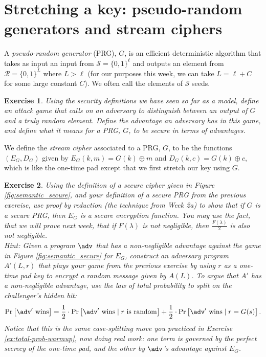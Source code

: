 \documentclass[12pt]{article}
\newcommand{\pr}[1]{\text{Pr}\left[#1\right]}
\newtheorem{exercise}{Exercise}
\theoremstyle{definition}
\theoremstyle{remark}
\theoremstyle{definition}
\begin{document}
\section*{Stretching a key: pseudo-random generators and stream ciphers}

A \emph{pseudo-random generator} (PRG), $G$, is an efficient deterministic algorithm that takes as input an input from $\mathcal{S} = \{0,1\}^\ell$ and outputs an element from $\mathcal{R} = \{0,1\}^L$ where $L > \ell$ (for our purposes this week, we can take $L = \ell + C$ for some large constant $C$). We often call the elements of $\mathcal{S}$ seeds.

\begin{exercise}\label{ex:DefinePRG} Using the security definitions we have seen so far as a model, define an attack game that calls on an adversary to distinguish between an output of $G$ and a truly random element. Define the advantage an adversary has in this game, and define what it means for a PRG, $G$, to be secure in terms of advantages.\\
\end{exercise}

We define the \emph{stream cipher} associated to a PRG, $G$, to be the functions $(E_G, D_G)$ given by $E_G(k, m) = G(k)\oplus m$ and $D_G(k, c) = G(k)\oplus c$, which is like the one-time pad except that we first stretch our key using $G$.

\begin{exercise}\label{ex:SecureStreamCipher}
Using the definition of a secure cipher given in Figure \ref{fig:semantic_secure}, and your definition of a secure PRG from the previous exercise, use proof by reduction (the technique from Week 2a) to show that if $G$ is a secure PRG, then $E_G$ is a secure encryption function. You may use the fact, that we will prove next week, that if $F(\lambda)$ is not negligible, then $\frac{F(\lambda)}{2}$ is also not negligible.\\
Hint: Given a program $\adv$ that has a non-negligible advantage against the game in Figure \ref{fig:semantic_secure} for $E_G$, construct an adversary program $A'(L, r)$ that plays your game from the previous exercise by using $r$ as a one-time pad key to encrypt a random message given by $A(L)$. To argue that $A'$ has a non-negligible advantage, use the law of total probability to split on the challenger's hidden bit: $$\pr{\adv'\text{ wins}} = \frac{1}{2}\cdot \pr{\adv'\text{ wins}\mid r\text{ is random}} + \frac{1}{2}\cdot \pr{\adv'\text{ wins}\mid r=G(s)}.$$
Notice that this is the same case-splitting move you practiced in Exercise \ref{ex:total-prob-warmup}, now doing real work: one term is governed by the perfect secrecy of the one-time pad, and the other by $\adv$'s advantage against $E_G$.
\end{exercise}
\end{document}
